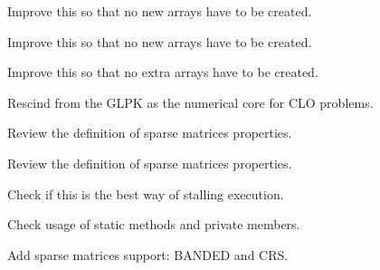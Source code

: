
\begin{DoxyRefList}
\item[\label{todo__todo000011}%
\hypertarget{todo__todo000011}{}%
Member \hyperlink{classmtk_1_1DenseMatrix_a59b9bea24acf39dca64e8549b3527463}{mtk\-:\-:Dense\-Matrix\-:\-:Order\-Col\-Major} ()]Improve this so that no new arrays have to be created.  
\item[\label{todo__todo000010}%
\hypertarget{todo__todo000010}{}%
Member \hyperlink{classmtk_1_1DenseMatrix_ac2949efba3e8278335d45418c85433e4}{mtk\-:\-:Dense\-Matrix\-:\-:Order\-Row\-Major} ()]Improve this so that no new arrays have to be created.  
\item[\label{todo__todo000009}%
\hypertarget{todo__todo000009}{}%
Member \hyperlink{classmtk_1_1DenseMatrix_a71d9c07ca66e88d97d1fd5012f43138b}{mtk\-:\-:Dense\-Matrix\-:\-:Transpose} ()]Improve this so that no extra arrays have to be created.  
\item[\label{todo__todo000004}%
\hypertarget{todo__todo000004}{}%
Class \hyperlink{classmtk_1_1GLPKAdapter}{mtk\-:\-:G\-L\-P\-K\-Adapter} ]Rescind from the G\-L\-P\-K as the numerical core for C\-L\-O problems.  
\item[\label{todo__todo000018}%
\hypertarget{todo__todo000018}{}%
Member \hyperlink{classmtk_1_1Matrix_ac96dd5f31ebcd4388352577487cd6f11}{mtk\-:\-:Matrix\-:\-:Increase\-Num\-Null} ()]Review the definition of sparse matrices properties.  
\item[\label{todo__todo000017}%
\hypertarget{todo__todo000017}{}%
Member \hyperlink{classmtk_1_1Matrix_a2e7c4b84d0cbf9b0122b5dc906ad1eae}{mtk\-:\-:Matrix\-:\-:Increase\-Num\-Zero} ()]Review the definition of sparse matrices properties.  
\item[\label{todo__todo000019}%
\hypertarget{todo__todo000019}{}%
Member \hyperlink{classmtk_1_1Tools_acbcff02946d3db565d53ecbcc459f0b5}{mtk\-:\-:Tools\-:\-:Prevent} (const bool condition, const char $\ast$fname, int lineno, const char $\ast$fxname)]Check if this is the best way of stalling execution.  
\item[\label{todo__todo000020}%
\hypertarget{todo__todo000020}{}%
Member \hyperlink{classmtk_1_1Tools_a04a60458594336ee1badff79b8a9a77f}{mtk\-:\-:Tools\-:\-:test\-\_\-number\-\_\-} ]Check usage of static methods and private members.  
\item[\label{todo__todo000001}%
\hypertarget{todo__todo000001}{}%
File \hyperlink{mtk__dense__matrix_8h}{mtk\-\_\-dense\-\_\-matrix.h} ]Add sparse matrices support\-: B\-A\-N\-D\-E\-D and C\-R\-S.


\end{DoxyRefList}
